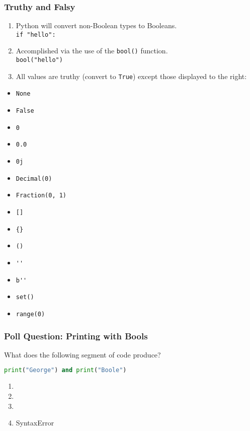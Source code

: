 \documentclass{beamer}
\begin{document}
%
%
\begin{frame}[fragile]
	\frametitle{Truthy and Falsy}
	\begin{minipage}{0.69\textwidth}
		\begin{enumerate}[A]
			\item Python will convert non-Boolean types to Booleans. \\\lstinline|if "hello":|
			\item Accomplished via the use of the \lstinline|bool()| function. \\\lstinline|bool("hello")|
			\item All values are truthy (convert to \lstinline|True|) except those displayed to the right:
		\end{enumerate}
	\end{minipage}
	\begin{minipage}{0.29\textwidth}
		{\scriptsize
			\begin{itemize} 
				\item \lstinline|None|
				\item \lstinline|False|
				\item \lstinline|0|
				\item \lstinline|0.0|
				\item \lstinline|0j|
				\item \lstinline|Decimal(0)|
				\item \lstinline|Fraction(0, 1)|
				\item \lstinline|[]|
				\item \lstinline|{}|
				\item \lstinline|()|
				\item \lstinline|''|
				\item \lstinline|b''|
				\item \lstinline|set()|
				\item \lstinline|range(0)|
		\end{itemize}}
	\end{minipage}
\end{frame}

%
%
\begin{frame}[fragile]
	\frametitle{Poll Question: Printing with Bools}
	What does the following segment of code produce?
	\begin{lstlisting}[language=Python, autogobble]
	print("George") and print("Boole")
	\end{lstlisting}
	\vfill
	\begin{enumerate}[A]
		\item {}
		\item {}
		\item {}
		\item SyntaxError
	\end{enumerate}
\end{frame}
\end{document}
